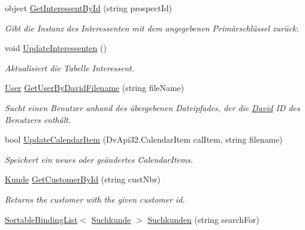 \begin{DoxyCompactItemize}
object \hyperlink{class_products_1_1_model_1_1_model_service_a752c4567416f83af060a5cac69455514}{Get\+Interessent\+By\+Id} (string prospect\+Id)
\begin{DoxyCompactList}\small\item\em Gibt die Instanz des Interessenten mit dem angegebenen Primärschlüssel zurück. \end{DoxyCompactList}\item 
void \hyperlink{class_products_1_1_model_1_1_model_service_a740ae0b94090f6e0cfd89a3ad51ee36f}{Update\+Interessenten} ()
\begin{DoxyCompactList}\small\item\em Aktualisiert die Tabelle Interessent. \end{DoxyCompactList}\item 
\hyperlink{class_products_1_1_model_1_1_entities_1_1_user}{User} \hyperlink{class_products_1_1_model_1_1_model_service_a9567df27fec83df4f6f13792c1d7fac2}{Get\+User\+By\+David\+Filename} (string file\+Name)
\begin{DoxyCompactList}\small\item\em Sucht einen Benutzer anhand des übergebenen Dateipfades, der die \hyperlink{namespace_david}{David} ID des Benutzers enthält. \end{DoxyCompactList}\item 
bool \hyperlink{class_products_1_1_model_1_1_model_service_a4395d48db4325f0477dda75968a566d2}{Update\+Calendar\+Item} (Dv\+Api32.\+Calendar\+Item cal\+Item, string filename)
\begin{DoxyCompactList}\small\item\em Speichert ein neues oder geändertes Calendar\+Items. \end{DoxyCompactList}\item 
\hyperlink{class_products_1_1_model_1_1_entities_1_1_kunde}{Kunde} \hyperlink{class_products_1_1_model_1_1_model_service_aa3ccbd580ad725b8970fe8c4b5f768e3}{Get\+Customer\+By\+Id} (string cust\+Nbr)
\begin{DoxyCompactList}\small\item\em Returns the customer with the given customer id. \end{DoxyCompactList}\item 
\hyperlink{class_products_1_1_common_1_1_sortable_binding_list}{Sortable\+Binding\+List}$<$ \hyperlink{class_products_1_1_model_1_1_entities_1_1_suchkunde}{Suchkunde} $>$ \hyperlink{class_products_1_1_model_1_1_model_service_a9fc5ea19c405904e5a1196751c1f23de}{Suchkunden} (string search\+For)

\end{DoxyCompactItemize}
